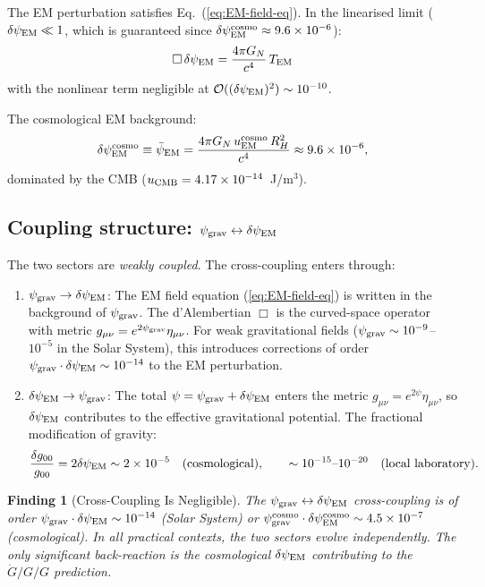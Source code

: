 \documentclass[11pt]{article}
\newtheorem{finding}{Finding}
\newcommand{\ee}[1]{\times 10^{#1}}
\newcommand{\psigrav}{\psi_{\rm grav}}
\newcommand{\dpsiEM}{\delta\psi_{\rm EM}}
\newcommand{\psiEM}{\bar{\psi}_{\rm EM}}
\newcommand{\GN}{G_N}
\newcommand{\Gdot}{\dot{G}/G}
\newcommand{\RH}{R_H}
\newcommand{\order}[1]{\mathcal{O}(#1)}
\begin{document}
The EM perturbation satisfies Eq.~(\ref{eq:EM-field-eq}). In the
linearised limit ($\dpsiEM \ll 1$, which is guaranteed since
$\dpsiEM^{\rm cosmo} \approx 9.6\ee{-6}$):
\begin{equation}
\Box\,\dpsiEM = \frac{4\pi\GN}{c^4}\,T_{\rm EM}
\label{eq:EM-field-eq-linear}
\end{equation}
with the nonlinear term negligible at $\order{(\dpsiEM)^2} \sim 10^{-10}$.

The cosmological EM background:
\begin{equation}
\dpsiEM^{\rm cosmo} \equiv \psiEM = \frac{4\pi\GN\,u_{\rm EM}^{\rm cosmo}\,\RH^2}{c^4}
\approx 9.6\ee{-6},
\label{eq:dpsiEM-cosmo}
\end{equation}
dominated by the CMB ($u_{\rm CMB} = 4.17\ee{-14}$~J/m$^3$).

\subsection{Coupling structure: $\psigrav \leftrightarrow \dpsiEM$}

The two sectors are \emph{weakly coupled}. The cross-coupling enters through:
\begin{enumerate}[nosep]
\item \textbf{$\psigrav \to \dpsiEM$}: The EM field equation
  (\ref{eq:EM-field-eq}) is written in the background of $\psigrav$.
  The d'Alembertian $\Box$ is the curved-space operator with metric
  $g_{\mu\nu} = e^{2\psigrav}\eta_{\mu\nu}$. For weak gravitational
  fields ($\psigrav \sim 10^{-9}$--$10^{-5}$ in the Solar System), this
  introduces corrections of order $\psigrav \cdot \dpsiEM \sim 10^{-14}$
  to the EM perturbation.

\item \textbf{$\dpsiEM \to \psigrav$}: The total $\psi = \psigrav + \dpsiEM$
  enters the metric $g_{\mu\nu} = e^{2\psi}\eta_{\mu\nu}$, so $\dpsiEM$
  contributes to the effective gravitational potential. The fractional
  modification of gravity:
  \begin{equation}
  \frac{\delta g_{00}}{g_{00}} = 2\dpsiEM \sim 2\ee{-5}
  \quad\text{(cosmological)}, \qquad
  \sim 10^{-15}\text{--}10^{-20}
  \quad\text{(local laboratory)}.
  \label{eq:cross-coupling}
  \end{equation}
\end{enumerate}

\begin{finding}[Cross-Coupling Is Negligible]
\label{find:cross-coupling}
The $\psigrav \leftrightarrow \dpsiEM$ cross-coupling is of order
$\psigrav \cdot \dpsiEM \sim 10^{-14}$ (Solar System) or
$\psigrav^{\rm cosmo} \cdot \dpsiEM^{\rm cosmo} \sim 4.5\ee{-7}$
(cosmological). In all practical contexts, the two sectors evolve
independently. The only significant back-reaction is the cosmological
$\dpsiEM$ contributing to the $\Gdot/G$ prediction.
\end{finding}
\end{document}
